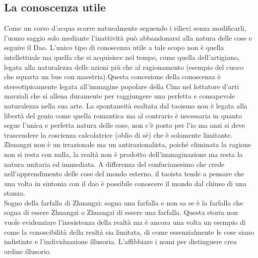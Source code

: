 \documentclass[10pt,a4paper]{report}
\begin{document}
\subsection{La conoscenza utile}
Come un corso d'acqua scorre naturalmente seguendo i rilievi senza modificarli, l'uomo saggio solo mediante l'inattività può abbandonarsi alla natura delle cose e seguire il Dao. L'unico tipo di conoscenza utile a tale scopo non è quella intellettuale ma quella che si acquisisce nel tempo, come quella dell'artigiano, legata alla naturalezza delle azioni più che al ragionamento (esempio del cuoco che squarta un bue con maestria).Questa concezione della conoscenza è stereotipicamente legata all'immagine popolare della Cina nel lottatore d'arti marziali che si allena duramente per raggiungere una perfetta e consapevole naturalezza nella sua arte. La spontaneità esaltata dal taoismo non è legata alla libertà del genio come quella romantica ma al contrario è necessaria in quanto segue l'unica e perfetta natura delle cose, non c'è posto per l'io ma anzi si deve trascendere la coscienza calcolatrice (oblio di sè) che è solamente limitante. Zhuangzi non è un irrazionale ma un antirazionalista, poiché eliminata la ragione non si resta con nulla, la realtà non è prodotto dell'immaginazione ma resta la natura unitaria ed immediata. A differenza del confucianesimo che crede nell'apprendimento delle cose del mondo esterno, il taoista tende a pensare che una volta in sintonia con il dao è possibile conoscere il mondo dal chiuso di una stanza.\\
Sogno della farfalla di Zhuangzi: sogna una farfalla e non sa se è la farfalla che sogna di essere Zhuangzi o Zhuangzi di essere una farfalla. Questa storia non vuole evidenziare l'inesistenza della realtà ma è ancora una volta un esempio di come la conoscibilità della realtà sia limitata, di come essenzialmente le cose siano indistinte e l'individuazione illusoria. L'affibbiare i nomi per distinguere crea ordine illusorio.
\end{document}

